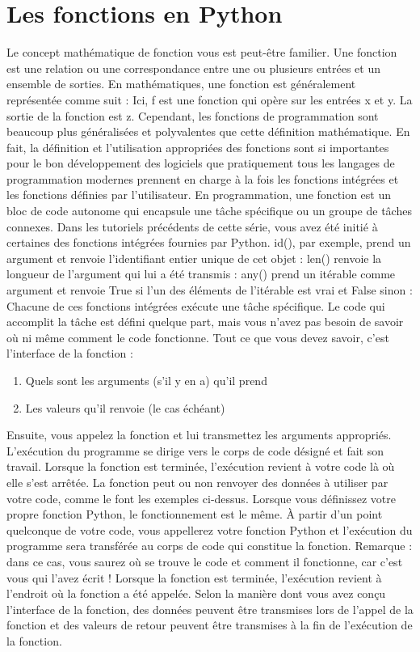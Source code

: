 \section{Les fonctions en Python}
Le concept mathématique de fonction vous est peut-être familier.  Une fonction est une relation ou une correspondance entre une ou plusieurs entrées et un ensemble de sorties.  En mathématiques, une fonction est généralement représentée comme suit :
Ici, f est une fonction qui opère sur les entrées x et y. La sortie de la fonction est z. Cependant, les fonctions de programmation sont beaucoup plus généralisées et polyvalentes que cette définition mathématique.  En fait, la définition et l'utilisation appropriées des fonctions sont si importantes pour le bon développement des logiciels que pratiquement tous les langages de programmation modernes prennent en charge à la fois les fonctions intégrées et les fonctions définies par l'utilisateur.
En programmation, une fonction est un bloc de code autonome qui encapsule une tâche spécifique ou un groupe de tâches connexes.  Dans les tutoriels précédents de cette série, vous avez été initié à certaines des fonctions intégrées fournies par Python. id(), par exemple, prend un argument et renvoie l'identifiant entier unique de cet objet :
len() renvoie la longueur de l'argument qui lui a été transmis :
any() prend un itérable comme argument et renvoie True si l'un des éléments de l'itérable est vrai et False sinon :
Chacune de ces fonctions intégrées exécute une tâche spécifique.  Le code qui accomplit la tâche est défini quelque part, mais vous n'avez pas besoin de savoir où ni même comment le code fonctionne.  Tout ce que vous devez savoir, c'est l'interface de la fonction :
\begin{enumerate}
\item Quels sont les arguments (s'il y en a) qu'il prend
\item Les valeurs qu'il renvoie (le cas échéant)
\end{enumerate}
Ensuite, vous appelez la fonction et lui transmettez les arguments appropriés.  L'exécution du programme se dirige vers le corps de code désigné et fait son travail.  Lorsque la fonction est terminée, l'exécution revient à votre code là où elle s'est arrêtée.  La fonction peut ou non renvoyer des données à utiliser par votre code, comme le font les exemples ci-dessus.
Lorsque vous définissez votre propre fonction Python, le fonctionnement est le même.  À partir d'un point quelconque de votre code, vous appellerez votre fonction Python et l'exécution du programme sera transférée au corps de code qui constitue la fonction.
Remarque : dans ce cas, vous saurez où se trouve le code et comment il fonctionne, car c'est vous qui l'avez écrit !
Lorsque la fonction est terminée, l'exécution revient à l'endroit où la fonction a été appelée.  Selon la manière dont vous avez conçu l'interface de la fonction, des données peuvent être transmises lors de l'appel de la fonction et des valeurs de retour peuvent être transmises à la fin de l'exécution de la fonction.
